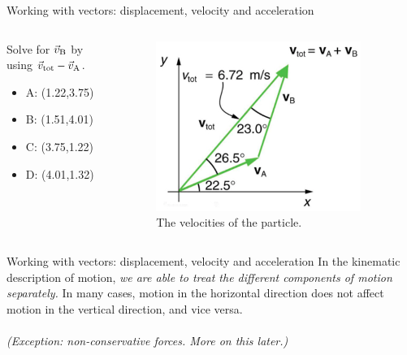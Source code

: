 \documentclass{beamer}
\begin{document}
\begin{frame}{Working with vectors: displacement, velocity and acceleration}
\begin{columns}[T]
\begin{column}{0.5\textwidth}
\small Solve for $\vec{v}_{\rm B}$ by using $\vec{v}_{\rm tot} - \vec{v}_{\rm A}$.
\begin{itemize}
\item A: (1.22,3.75)
\item B: (1.51,4.01)
\item C: (3.75,1.22)
\item D: (4.01,1.32)
\end{itemize}
\end{column}
\begin{column}{0.5\textwidth}
\begin{figure}
\centering
\includegraphics[width=0.9\textwidth]{figures/vecdiag2.png}
\caption{\label{fig:vecdiag4} The velocities of the particle.}
\end{figure}
\end{column}
\end{columns}
\end{frame}

\begin{frame}{Working with vectors: displacement, velocity and acceleration}
In the kinematic description of motion, \alert{\textit{we are able to treat the different components of motion separately.}}  In many cases, motion in the horizontal direction does not affect motion in the vertical direction, and vice versa.\\
\vspace{0.5cm}
\small
{} \\
\vspace{1cm}
\textit{(Exception: non-conservative forces.  More on this later.)}
\end{frame}
\end{document}
